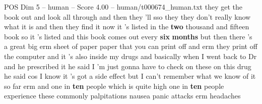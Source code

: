 \begin{textsample}{POS Dim 5 – human – Score 4.00 – human/t000674\_human.txt}  \label{ex:f5_pos_016}
they get the book out and look all through and then they 'll sso they they don't really know what it is and then they find it now it 's listed in the \textbf{two} thousand and fifteen book so it 's listed and this book comes out every \textbf{six} \textbf{months} but then there 's a great big erm sheet of paper paper that you can print off and erm they print off the computer and it 's also inside my drugs and basically when I went back to Dr and he prescribed it he said I 'm just gonna have to check on these on this drug he said cos I know it 's got a side effect but I can't remember what we know of it so far erm and one in \textbf{ten} people which is quite high one in \textbf{ten} people experience these commonly palpitations nausea panic attacks erm headaches

\end{textsample}
